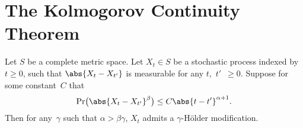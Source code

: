 \section	{The Kolmogorov Continuity Theorem}

\begin	{theorem}
Let $S$ be a complete metric space.
Let \( X_t \in S \) be a stochastic process indexed by \( t \ge 0 \),
such that $\abs{X_t-X_{t'}}$ is measurable for any $t$,~$t'$~$\ge 0$.
Suppose for some constant~$C$ that
\begin	{equation}
\label	{eq:kolmogorov-continuity}
	\Pr\bigl(\abs{X_t-X_{t'}}^\beta\bigr) \le C\abs{t-t'}^{\alpha+1} \text.
\end	{equation}
Then for any~$\gamma$ such that \( \alpha > \beta\gamma \),
$X_t$ admits a $\gamma$\nobreakdash-Hölder modification.
\end	{theorem}
